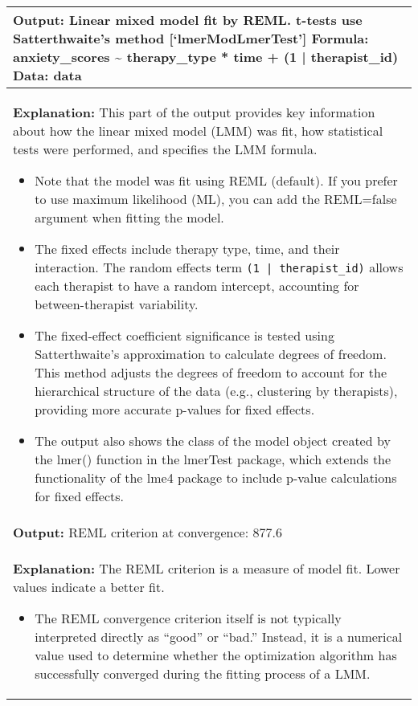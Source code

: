  
 \small{
\begin{longtable}{|p{\linewidth}|}
\hline
\rowcolor{gray!10}
\textbf{Output:} \newline 
Linear mixed model fit by REML. t-tests use Satterthwaite's method [`lmerModLmerTest'] \newline 
Formula: anxiety\_scores \textasciitilde{} therapy\_type * time + (1 | therapist\_id) \newline
Data: data\\
\hline
\textbf{Explanation:} \newline 
This part of the output provides key information about how the linear mixed model (LMM) was fit, how statistical tests were performed, and specifies the LMM formula. \newline
\begin{itemize}
\item Note that the model was fit using REML (default).  If you prefer to use maximum likelihood (ML), you can add the REML=false argument when fitting the model. 
\item The fixed effects include therapy type, time, and their interaction. The random effects term \texttt{(1 | therapist\_id)} allows each therapist to have a random intercept, accounting for between-therapist variability.
\item The fixed-effect coefficient significance is tested using Satterthwaite’s approximation to calculate degrees of freedom. This method adjusts the degrees of freedom to account for the hierarchical structure of the data (e.g., clustering by therapists), providing more accurate p-values for fixed effects.
\item The output also shows the class of the model object created by the lmer() function in the lmerTest package, which extends the functionality of the lme4 package to include p-value calculations for fixed effects.\end{itemize} \\
\hline
\rowcolor{gray!10}
\textbf{Output:} \newline 
REML criterion at convergence: 877.6 \\ 
\hline
\textbf{Explanation:} \newline 
The REML criterion is a measure of model fit. Lower values indicate a better fit. \begin{itemize}
\item The REML convergence criterion itself is not typically interpreted directly as ``good'' or ``bad.'' Instead, it is a numerical value used to determine whether the optimization algorithm has successfully converged during the fitting process of a LMM. 

\end{itemize}
\end{longtable}}
